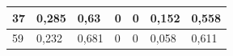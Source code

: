 \documentclass{classrep}
\begin{document}
{\begin{table}[H]
\begin{center}
\begin{tabular}{|l|l|l|l|l|l|l|}
37                                                                 & 0,285                                                        & 0,63                                                            & 0                                                                & 0                                                                   & 0,152                                                           & 0,558                                                              \\ \hline
59                                                                 & 0,232                                                        & 0,681                                                           & 0                                                                & 0                                                                   & 0,058                                                           & 0,611                                                              \\ \hline
\end{tabular}
\end{center}
\end{table}

}
\end{document}
